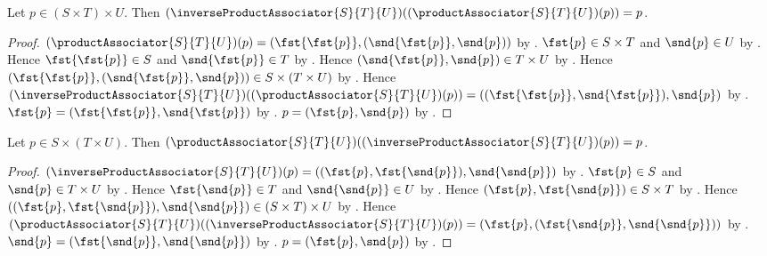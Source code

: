 \begin{proposition}\label{inverse_associator_after_associator}
    Let $p\in(S\times T)\times U$.
    Then $(\inverseProductAssociator{S}{T}{U})
        ((\productAssociator{S}{T}{U})(p))=p$.
\end{proposition}
\begin{proof}
    $(\productAssociator{S}{T}{U})(p)
        =(\fst{\fst{p}},(\snd{\fst{p}},\snd{p}))$ by
        .
    $\fst{p}\in S\times T$ and $\snd{p}\in U$ by
        .
    Hence $\fst{\fst{p}}\in S$ and $\snd{\fst{p}}\in T$ by
        .
    Hence $(\snd{\fst{p}},\snd{p})\in T\times U$ by
        .
    Hence $(\fst{\fst{p}},(\snd{\fst{p}},\snd{p}))
        \in S\times(T\times U)$ by .
    Hence $(\inverseProductAssociator{S}{T}{U})
        ((\productAssociator{S}{T}{U})(p))
        =((\fst{\fst{p}},\snd{\fst{p}}),\snd{p})$ by
        .
    $\fst{p}=(\fst{\fst{p}},\snd{\fst{p}})$ by
        .
    $p=(\fst{p},\snd{p})$ by
        .
\end{proof}

\begin{proposition}\label{associator_after_inverse_associator}
    Let $p\in S\times(T\times U)$.
    Then $(\productAssociator{S}{T}{U})
        ((\inverseProductAssociator{S}{T}{U})(p))=p$.
\end{proposition}
\begin{proof}
    $(\inverseProductAssociator{S}{T}{U})(p)
        =((\fst{p},\fst{\snd{p}}),\snd{\snd{p}})$ by
        .
    $\fst{p}\in S$ and $\snd{p}\in T\times U$ by
        .
    Hence $\fst{\snd{p}}\in T$ and $\snd{\snd{p}}\in U$ by
        .
    Hence $(\fst{p},\fst{\snd{p}})\in S\times T$ by
        .
    Hence $((\fst{p},\fst{\snd{p}}),\snd{\snd{p}})
        \in(S\times T)\times U$ by .
    Hence $(\productAssociator{S}{T}{U})
        ((\inverseProductAssociator{S}{T}{U})(p))
        =(\fst{p},(\fst{\snd{p}},\snd{\snd{p}}))$ by
        .
    $\snd{p}=(\fst{\snd{p}},\snd{\snd{p}})$ by
        .
    $p=(\fst{p},\snd{p})$ by
        .
\end{proof}

